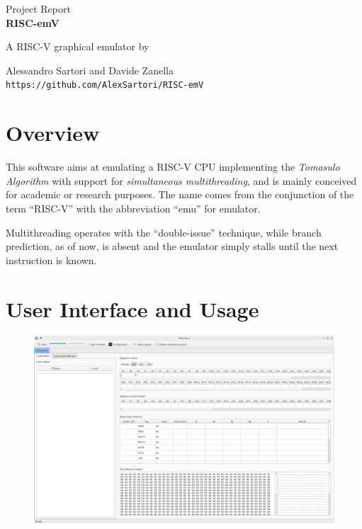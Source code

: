 \documentclass[12pt]{article}
\begin{document}
\begin{center}
    \vspace*{4cm}
    \LARGE{Project Report\\}
    \vspace{2 cm}
    \Huge\textbf{RISC-emV\\}
    \vspace{2 cm}
    
    \large{A RISC-V graphical emulator by\\}
        
    \large{Alessandro Sartori and Davide Zanella\\}
    \vspace{1 cm}
    \large{\texttt{https://github.com/AlexSartori/RISC-emV}}
\end{center}

\clearpage


\section{Overview}
This software aims at emulating a RISC-V CPU implementing the \textit{Tomasulo Algorithm} with support for \textit{simultaneous multithreading}, and is mainly conceived for academic or research purposes. The name comes from the conjunction of the term “RISC-V” with the abbreviation “emu” for emulator.

Multithreading operates with the “double-issue” technique, while branch prediction, as of now, is absent and the emulator simply stalls until the next instruction is known.

\section{User Interface and Usage}

\begin{figure}[h!]
\centering
\includegraphics[width=\textwidth]{image_1.png}
\end{figure}
\end{document}
